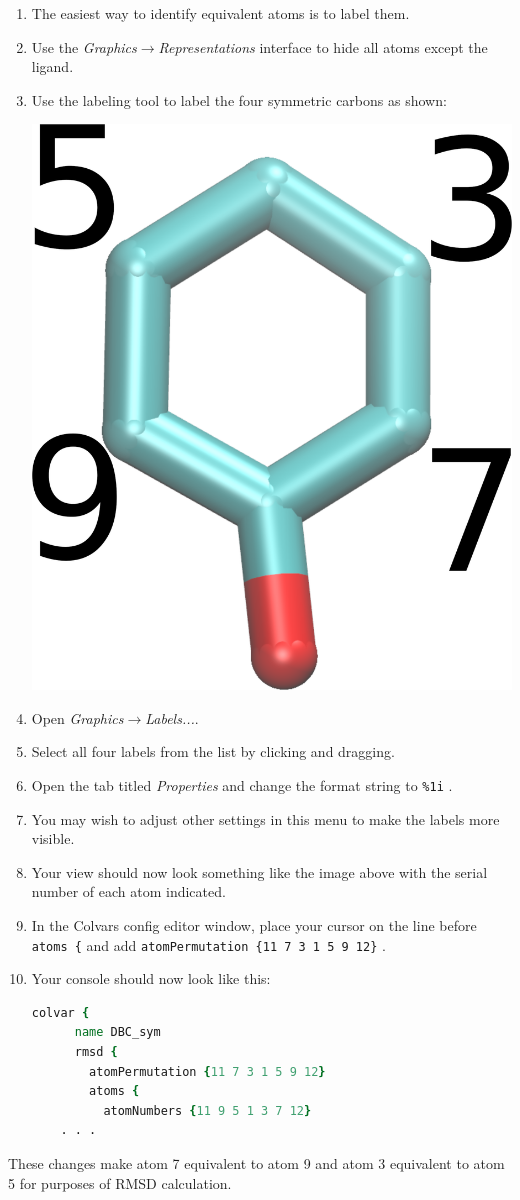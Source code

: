 \documentclass[9pt,tutorial]{Styling/livecoms}
\newcommand{\menu}[1]{\textit{#1}}
\newcommand{\textInput}[1]{\texttt{#1}}
\begin{document}
\begin{enumerate}
     \item The easiest way to identify equivalent atoms is to label them.
     \item Use the \menu{Graphics$\rightarrow$Representations} interface to hide all atoms except the ligand.
     \item Use the labeling tool to label the four symmetric carbons as shown:
     \begin{center}
        \includegraphics[width=0.2\linewidth]{example_symmetry_labels.png}
     \end{center}
     \item Open \menu{Graphics$\rightarrow$Labels...}.
     \item Select all four labels from the list by clicking and dragging.
     \item Open the tab titled \menu{Properties} and change the format string to \textInput{\%1i} .
     \item You may wish to adjust other settings in this menu to make the labels more visible.
     \item Your view should now look something like the image above with the serial number of each atom indicated.
     \item In the Colvars config editor window, place your cursor on the line before \textInput{atoms \{} and add \linebreak\textInput{atomPermutation \{11 7 3 1 5 9 12\}} .
     \item Your console should now look like this:
    \begin{lstlisting}[language=tcl]
    colvar {
      name DBC_sym
      rmsd {
        atomPermutation {11 7 3 1 5 9 12}
        atoms {
          atomNumbers {11 9 5 1 3 7 12}
    . . .
    \end{lstlisting}
\end{enumerate}

These changes make atom 7 equivalent to atom 9 and atom 3 equivalent to atom 5 for purposes of RMSD calculation.
\end{document}
